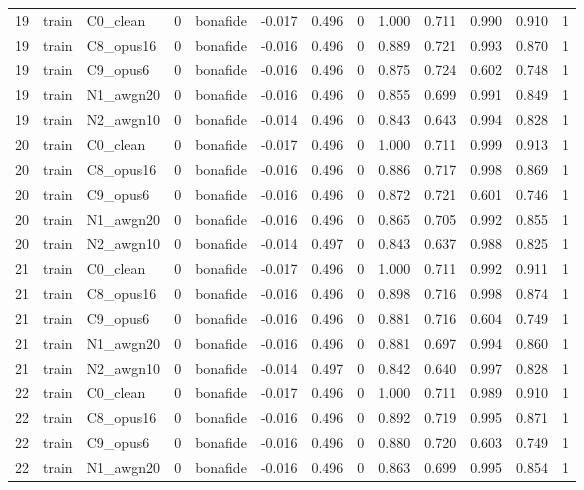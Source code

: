 \begin{tabular}{rllrlrrrrrrrr}
19 & train & C0_clean & 0 & bonafide & -0.017 & 0.496 & 0 & 1.000 & 0.711 & 0.990 & 0.910 & 1 \\
19 & train & C8_opus16 & 0 & bonafide & -0.016 & 0.496 & 0 & 0.889 & 0.721 & 0.993 & 0.870 & 1 \\
19 & train & C9_opus6 & 0 & bonafide & -0.016 & 0.496 & 0 & 0.875 & 0.724 & 0.602 & 0.748 & 1 \\
19 & train & N1_awgn20 & 0 & bonafide & -0.016 & 0.496 & 0 & 0.855 & 0.699 & 0.991 & 0.849 & 1 \\
19 & train & N2_awgn10 & 0 & bonafide & -0.014 & 0.496 & 0 & 0.843 & 0.643 & 0.994 & 0.828 & 1 \\
20 & train & C0_clean & 0 & bonafide & -0.017 & 0.496 & 0 & 1.000 & 0.711 & 0.999 & 0.913 & 1 \\
20 & train & C8_opus16 & 0 & bonafide & -0.016 & 0.496 & 0 & 0.886 & 0.717 & 0.998 & 0.869 & 1 \\
20 & train & C9_opus6 & 0 & bonafide & -0.016 & 0.496 & 0 & 0.872 & 0.721 & 0.601 & 0.746 & 1 \\
20 & train & N1_awgn20 & 0 & bonafide & -0.016 & 0.496 & 0 & 0.865 & 0.705 & 0.992 & 0.855 & 1 \\
20 & train & N2_awgn10 & 0 & bonafide & -0.014 & 0.497 & 0 & 0.843 & 0.637 & 0.988 & 0.825 & 1 \\
21 & train & C0_clean & 0 & bonafide & -0.017 & 0.496 & 0 & 1.000 & 0.711 & 0.992 & 0.911 & 1 \\
21 & train & C8_opus16 & 0 & bonafide & -0.016 & 0.496 & 0 & 0.898 & 0.716 & 0.998 & 0.874 & 1 \\
21 & train & C9_opus6 & 0 & bonafide & -0.016 & 0.496 & 0 & 0.881 & 0.716 & 0.604 & 0.749 & 1 \\
21 & train & N1_awgn20 & 0 & bonafide & -0.016 & 0.496 & 0 & 0.881 & 0.697 & 0.994 & 0.860 & 1 \\
21 & train & N2_awgn10 & 0 & bonafide & -0.014 & 0.497 & 0 & 0.842 & 0.640 & 0.997 & 0.828 & 1 \\
22 & train & C0_clean & 0 & bonafide & -0.017 & 0.496 & 0 & 1.000 & 0.711 & 0.989 & 0.910 & 1 \\
22 & train & C8_opus16 & 0 & bonafide & -0.016 & 0.496 & 0 & 0.892 & 0.719 & 0.995 & 0.871 & 1 \\
22 & train & C9_opus6 & 0 & bonafide & -0.016 & 0.496 & 0 & 0.880 & 0.720 & 0.603 & 0.749 & 1 \\
22 & train & N1_awgn20 & 0 & bonafide & -0.016 & 0.496 & 0 & 0.863 & 0.699 & 0.995 & 0.854 & 1 \\

\end{tabular}
